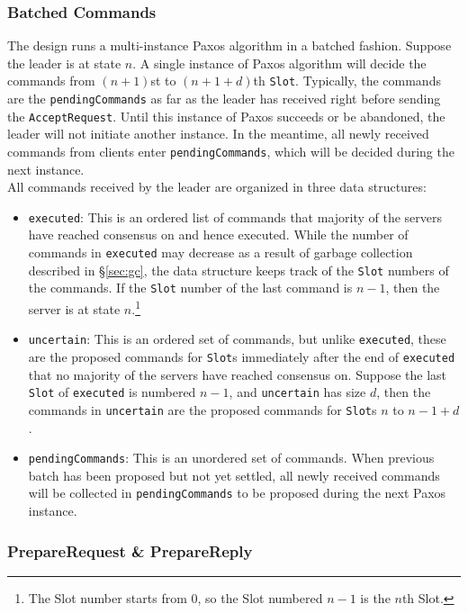 \documentclass{article}
\numberwithin{equation}{section}
\begin{document}
\subsubsection{Batched Commands}\label{sec:batch}
The design runs a multi-instance Paxos algorithm in a batched fashion. Suppose the leader is at state $n$. A single instance of Paxos algorithm will decide the commands from $(n+1)$st to $(n+1+d)$th \verb|Slot|. Typically, the commands are the \verb|pendingCommands| as far as the leader has received right before sending the \verb|AcceptRequest|. Until this instance of Paxos succeeds or be abandoned, the leader will not initiate another instance. In the meantime, all newly received commands from clients enter \verb|pendingCommands|, which will be decided during the next instance.\\

All commands received by the leader are organized in three data structures:
\begin{itemize}
	\item \verb|executed|: This is an ordered list of commands that majority of the servers have reached consensus on and hence executed. While the number of commands in \verb|executed| may decrease as a result of garbage collection described in \S\ref{sec:gc}, the data structure keeps track of the \verb|Slot| numbers of the commands. If the \verb|Slot| number of the last command is $n-1$, then the server is at state $n$.\footnote{The Slot number starts from $0$, so the Slot numbered $n-1$ is the $n$th Slot.}
	\item \verb|uncertain|: This is an ordered set of commands, but unlike \verb|executed|, these are the proposed commands for \verb|Slot|s immediately after the end of \verb|executed| that no majority of the servers have reached consensus on. Suppose the last \verb|Slot| of \verb|executed| is numbered $n-1$, and \verb|uncertain| has size $d$, then the commands in \verb|uncertain| are the proposed commands for \verb|Slot|s $n$ to $n-1+d$.
	\item \verb|pendingCommands|: This is an unordered set of commands. When previous batch has been proposed but not yet settled, all newly received commands will be collected in \verb|pendingCommands| to be proposed during the next Paxos instance.
\end{itemize}

\subsubsection{PrepareRequest \& PrepareReply}
\end{document}
